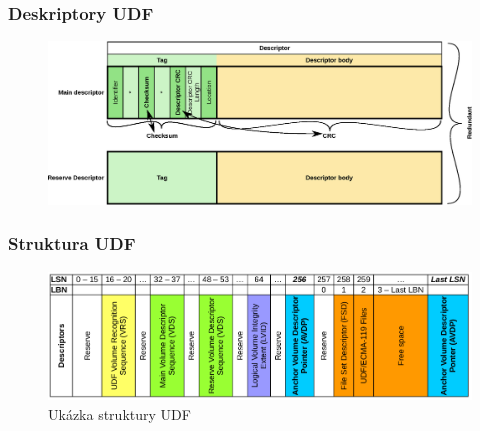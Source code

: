 \documentclass[aspectratio=169]{beamer}
\begin{document}
        \begin{frame}
            \frametitle{Deskriptory UDF}
			\vspace{40 pt}
			\center
            \begin{figure}
			    \includegraphics[width=14.5cm]{det-ch.eps}
            \end{figure}
        \end{frame}
		\begin{frame}
			\frametitle{Struktura UDF}
			\vspace{40 pt}
			\center
            \begin{figure}
			    \includegraphics[width=14cm]{UDF-example-schema.png}
                \caption{\Large{Ukázka struktury UDF}}
            \end{figure}
		\end{frame}
	
\end{document}
